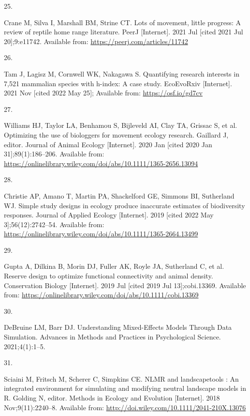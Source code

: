 \documentclass[10pt,a4paper]{article}
\newlength{\cslhangindent}
\newlength{\csllabelwidth}
\newlength{\cslentryspacingunit} %
\newenvironment{CSLReferences}[2] %
 {%
  \setlength{\parindent}{0pt}
  \ifodd #1
  \let\oldpar\par
  \def\par{\hangindent=\cslhangindent\oldpar}
  \fi
  \setlength{\parskip}{#2\cslentryspacingunit}
 }%
 {}
\newcommand{\CSLLeftMargin}[1]{\parbox[t]{\csllabelwidth}{#1}}
\newcommand{\CSLRightInline}[1]{\parbox[t]{\linewidth - \csllabelwidth}{#1}\break}
\begin{document}
\begin{CSLReferences}{0}{0}
\leavevmode{}%
\CSLLeftMargin{25. }
\CSLRightInline{Crane M, Silva I, Marshall BM, Strine CT. Lots of movement, little progress: A review of reptile home range literature. PeerJ {[}Internet{]}. 2021 Jul {[}cited 2021 Jul 20{]};9:e11742. Available from: \url{https://peerj.com/articles/11742}}

\leavevmode{}%
\CSLLeftMargin{26. }
\CSLRightInline{Tam J, Lagisz M, Cornwell WK, Nakagawa S. Quantifying research interests in 7,521 mammalian species with h-index: A case study. EcoEvoRxiv {[}Internet{]}. 2021 Nov {[}cited 2022 May 25{]}; Available from: \url{https://osf.io/gd7cv}}

\leavevmode{}%
\CSLLeftMargin{27. }
\CSLRightInline{Williams HJ, Taylor LA, Benhamou S, Bijleveld AI, Clay TA, Grissac S, et al. Optimizing the use of biologgers for movement ecology research. Gaillard J, editor. Journal of Animal Ecology {[}Internet{]}. 2020 Jan {[}cited 2020 Jan 31{]};89(1):186--206. Available from: \url{https://onlinelibrary.wiley.com/doi/abs/10.1111/1365-2656.13094}}

\leavevmode{}%
\CSLLeftMargin{28. }
\CSLRightInline{Christie AP, Amano T, Martin PA, Shackelford GE, Simmons BI, Sutherland WJ. Simple study designs in ecology produce inaccurate estimates of biodiversity responses. Journal of Applied Ecology {[}Internet{]}. 2019 {[}cited 2022 May 3{]};56(12):2742--54. Available from: \url{https://onlinelibrary.wiley.com/doi/abs/10.1111/1365-2664.13499}}

\leavevmode{}%
\CSLLeftMargin{29. }
\CSLRightInline{Gupta A, Dilkina B, Morin DJ, Fuller AK, Royle JA, Sutherland C, et al. Reserve design to optimize functional connectivity and animal density. Conservation Biology {[}Internet{]}. 2019 Jul {[}cited 2019 Jul 13{]};cobi.13369. Available from: \url{https://onlinelibrary.wiley.com/doi/abs/10.1111/cobi.13369}}

\leavevmode{}%
\CSLLeftMargin{30. }
\CSLRightInline{DeBruine LM, Barr DJ. Understanding {Mixed}-{Effects} {Models} {Through} {Data} {Simulation}. Advances in Methods and Practices in Psychological Science. 2021;4(1):1--5. }

\leavevmode{}%
\CSLLeftMargin{31. }
\CSLRightInline{Sciaini M, Fritsch M, Scherer C, Simpkins CE. {NLMR} and landscapetools : {An} integrated environment for simulating and modifying neutral landscape models in {R}. Golding N, editor. Methods in Ecology and Evolution {[}Internet{]}. 2018 Nov;9(11):2240--8. Available from: \url{http://doi.wiley.com/10.1111/2041-210X.13076}}


\end{CSLReferences}
\end{document}
